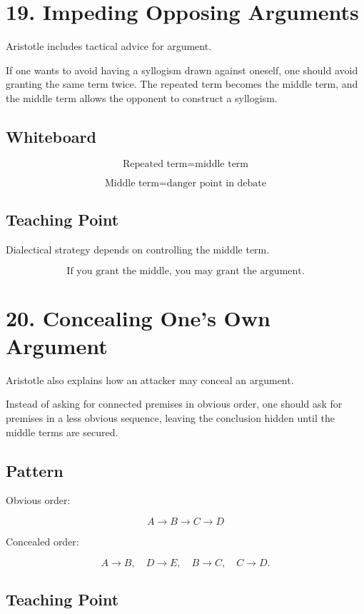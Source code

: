 \documentclass[12pt]{article}
\begin{document}
\section*{19. Impeding Opposing Arguments}

Aristotle includes tactical advice for argument.

If one wants to avoid having a syllogism drawn against oneself, one should
avoid granting the same term twice. The repeated term becomes the middle term,
and the middle term allows the opponent to construct a syllogism.

\subsection*{Whiteboard}

\[
\text{Repeated term} = \text{middle term}
\]

\[
\text{Middle term} = \text{danger point in debate}
\]

\subsection*{Teaching Point}

Dialectical strategy depends on controlling the middle term.

\[
\boxed{
\text{If you grant the middle, you may grant the argument.}
}
\]

\section*{20. Concealing One's Own Argument}

Aristotle also explains how an attacker may conceal an argument.

Instead of asking for connected premises in obvious order, one should ask for
premises in a less obvious sequence, leaving the conclusion hidden until the
middle terms are secured.

\subsection*{Pattern}

Obvious order:

\[
A \rightarrow B \rightarrow C \rightarrow D
\]

Concealed order:

\[
A \rightarrow B,
\quad
D \rightarrow E,
\quad
B \rightarrow C,
\quad
C \rightarrow D.
\]

\subsection*{Teaching Point}
\end{document}
